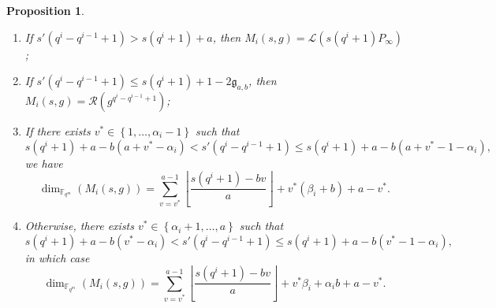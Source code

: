 \documentclass[a4paper]{amsart}
\newtheorem{proposition}[thm]{Proposition}
\theoremstyle{definition}
\theoremstyle{remark}
\newcommand{\calL}{\mathcal{L}}
\newcommand{\calR}{\mathcal{R}}
\newcommand{\fqm}{\mathbb{F}_{q^m}}
\newcommand{\set}[1]{\left\{#1\right\}}
\begin{document}
\begin{proposition} \label{prop:dim_M_i's}
    \begin{enumerate}
        \item If $s'(q^i-q^{i-1}+1) > s(q^i+1)+a$, then $M_i(s,g) = \calL(s(q^i+1)P_\infty)$;
        
        \item If $s'(q^i-q^{i-1}+1) \leq s(q^i+1)+1-2\mathfrak{g}_{a,b}$, then $M_i(s,g) = \calR(g^{q^{i}-q^{i-1}+1})$;
        
        \item If there exists $v^* \in \set{1,\dots,\alpha_i-1}$ such that
        $$ s(q^i+1)+a-b(a+v^*-\alpha_i) < s'(q^i-q^{i-1}+1) \leq  s(q^i+1)+a-b(a+v^*-1-\alpha_i),$$
        we have 
          $$\dim_{\fqm}(M_i(s,g)) = \sum\limits_{v=v^*}^{a-1} \left\lfloor \dfrac{s(q^i+1)-bv}{a} \right\rfloor + v^*(\beta_i+b) + a-v^*.$$
        
        \item Otherwise, there exists $v^* \in \set{\alpha_i+1,\dots,a}$ such that
        $$ s(q^i+1)+a-b(v^*-\alpha_i) < s'(q^i-q^{i-1}+1) \leq  s(q^i+1)+a-b(v^*-1-\alpha_i),$$
        in which case 
        $$\dim_{\fqm}(M_i(s,g)) = \sum\limits_{v=v^*}^{a-1} \left\lfloor \dfrac{s(q^i+1)-bv}{a} \right\rfloor + v^*\beta_i + \alpha_ib +a-v^*.$$
    \end{enumerate}
\end{proposition}
\end{document}
